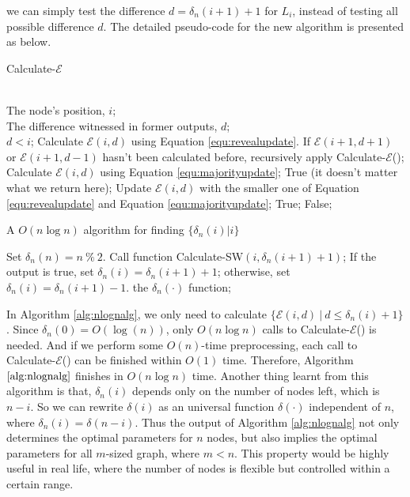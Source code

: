 \documentclass[a4paper,UKenglish]{lipics}
\theoremstyle{definition}
\begin{document}
	we can simply test the difference $d = \delta_n(i+1)+1$ for $L_i$,
	instead of testing all possible difference $d$. 
The detailed pseudo-code for the new algorithm is presented as below.
\\
\begin{algorithm}[htb]
\caption{Calculate-$\mathcal{E}$}
\begin{algorithmic}[1]
\REQUIRE ~~\\
	The node's position, $i$;\\
	The difference witnessed in former outputs, $d$;
\ENSURE ~~\\              
	$d < i$;
		\STATE Calculate $\mathcal{E}(i,d)$ using Equation \ref{equ:revealupdate}. 
		\STATE If $\mathcal{E}(i+1, d+1)$ or $\mathcal{E}(i+1, d-1)$ hasn't been calculated before, recursively apply Calculate-$\mathcal{E}$();
	\ELSE
		\STATE Calculate $\mathcal{E}(i,d)$ using Equation \ref{equ:majorityupdate};
	\ENDIF
	\RETURN True (it doesn't matter what we return here);
\ELSE
	\STATE Update $\mathcal{E}(i,d)$ with the smaller one of Equation \ref{equ:revealupdate} and Equation \ref{equ:majorityupdate};
		\RETURN True;
	\ELSE
		\RETURN False;
	\ENDIF
\ENDIF

\end{algorithmic}
\end{algorithm}
\begin{algorithm}[htb]
\caption{A $O(n\log n)$ algorithm for finding $\{\delta_n(i)|i\}$} \label{alg:nlognalg}
\begin{algorithmic}[1]
\STATE Set $\delta_n(n) = n~ \% ~2$.
	\STATE Call function Calculate-SW$(i,\delta_n(i+1)+1)$;
	\STATE If the output is true, set $\delta_n(i) = \delta_n(i+1)+1$; otherwise, set $\delta_n(i) = \delta_n(i+1)-1$.
\ENDFOR
\RETURN the $\delta_n(\cdot)$ function;
\end{algorithmic}
\end{algorithm}

In Algorithm \ref{alg:nlognalg}, we only need to calculate $\{\mathcal{E}(i,d) ~|~ d \le \delta_n(i) + 1\}$.
Since $\delta_n(0) = O(\log(n))$, only $O(n\log n)$ calls to Calculate-$\mathcal{E}$() is needed. 
And if we perform some $O(n)$-time preprocessing, each call to Calculate-$\mathcal{E}$() can be finished within $O(1)$ time. 
Therefore, Algorithm $\ref{alg:nlognalg}$ finishes in $O(n\log n)$ time.
Another thing learnt from this algorithm is that, $\delta_n(i)$ depends only on the number of nodes left, which is $n-i$. 
So we can rewrite $\delta(i)$ as an universal function $\delta(\cdot)$ independent of $n$, where $\delta_n(i) = \delta(n-i)$.
Thus the output of Algorithm \ref{alg:nlognalg} not only determines the optimal parameters for $n$ nodes, 
	but also implies the optimal parameters for all $m$-sized graph, where $m<n$. 
This property would be highly useful in real life, where the number of nodes is flexible but controlled within a certain range.
\end{document}
